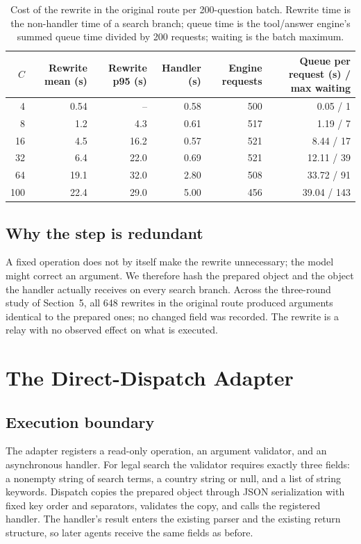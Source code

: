 \documentclass[paper]{ieice}
\begin{document}
\begin{table}[!t]
\caption{Cost of the rewrite in the original route per 200-question batch. Rewrite time is the non-handler time of a search branch; queue time is the tool/answer engine's summed queue time divided by 200 requests; waiting is the batch maximum.}
\label{tab:before}
\centering\small
\begin{tabular}{rrrrrr}
\toprule
$C$ & Rewrite mean (s) & Rewrite p95 (s) & Handler (s) & Engine requests & Queue per request (s) / max waiting\\
\midrule
4 & 0.54 & -- & 0.58 & 500 & 0.05 / 1\\
8 & 1.2 & 4.3 & 0.61 & 517 & 1.19 / 7\\
16 & 4.5 & 16.2 & 0.57 & 521 & 8.44 / 17\\
32 & 6.4 & 22.0 & 0.69 & 521 & 12.11 / 39\\
64 & 19.1 & 32.0 & 2.80 & 508 & 33.72 / 91\\
100 & 22.4 & 29.0 & 5.00 & 456 & 39.04 / 143\\
\bottomrule
\end{tabular}
\end{table}

\subsection{Why the step is redundant}
A fixed operation does not by itself make the rewrite unnecessary; the model might correct an argument. We therefore hash the prepared object and the object the handler actually receives on every search branch. Across the three-round study of Section~5, all 648 rewrites in the original route produced arguments identical to the prepared ones; no changed field was recorded. The rewrite is a relay with no observed effect on what is executed.

\section{The Direct-Dispatch Adapter}
\subsection{Execution boundary}
The adapter registers a read-only operation, an argument validator, and an asynchronous handler. For legal search the validator requires exactly three fields: a nonempty string of search terms, a country string or null, and a list of string keywords. Dispatch copies the prepared object through JSON serialization with fixed key order and separators, validates the copy, and calls the registered handler. The handler's result enters the existing parser and the existing return structure, so later agents receive the same fields as before.
\end{document}

